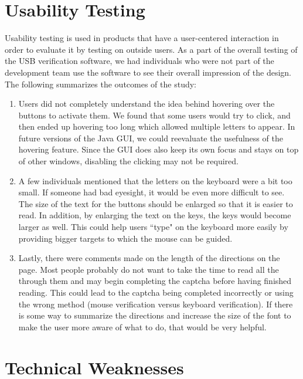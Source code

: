 \documentclass[pagenumbers]{ieee}
\begin{document}

\section{Usability Testing}

Usability testing is used in products that have a user-centered interaction in order to evaluate it by testing on outside users. As a part of the overall testing of the USB verification software, we had individuals who were not part of the development team use the software to see their overall impression of the design. The following summarizes  the outcomes of the study:
\begin{enumerate}
\item Users did not completely understand the idea behind hovering over the buttons to activate them. We found that some users would try to click, and then ended up hovering too long which allowed multiple letters to appear. In future versions of the Java GUI, we could reevaluate the usefulness of the hovering feature. Since the GUI does also keep its own focus and stays on top of other windows, disabling the clicking may not be required. 
\item A few individuals mentioned that the letters on the keyboard were a bit too small. If someone had bad eyesight, it would be even more difficult to see. The size of the text for the buttons should be enlarged so that it is easier to read. In addition, by enlarging the text on the keys, the keys would become larger as well. This could help users ``type" on the keyboard more easily by providing bigger targets to which the mouse can be guided.
\item Lastly, there were comments made on the length of the directions on the page. Most people probably do not want to take the time to read all the through them and may begin completing the captcha before having finished reading. This could lead to the captcha being completed incorrectly or using the wrong method (mouse verification versus keyboard verification). If there is some way to summarize the directions and increase the size of the font to make the user more aware of what to do, that would be very helpful.
\end{enumerate}

\section{Technical Weaknesses}
\label{section:weakness}
\end{document}
